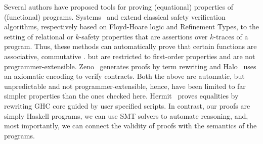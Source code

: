 %
Several authors have proposed tools for proving
(equational) properties of (functional) programs.
%
Systems~\citep{sousa16} and \citep{KobayashiRelational15}
extend classical safety verification algorithms,
respectively based on Floyd-Hoare logic and Refinement Types,
to the setting of relational or $k$-safety properties
that are assertions over $k$-traces of a program.
%
Thus, these methods can automatically prove that
certain functions are associative, commutative \etc.
but are restricted to first-order properties and
are not programmer-extensible.
%
Zeno~\citep{ZENO} generates proofs by term
rewriting and Halo~\citep{halo} uses an axiomatic
encoding to verify contracts.
%
Both the above are automatic, but unpredictable and not
programmer-extensible, hence, have been limited to
far simpler properties than the ones checked here.
%
Hermit~\citep{Farmer15} proves equalities by rewriting
GHC core guided by user specified scripts.
%
In contrast, our proofs are simply Haskell programs,
we can use SMT solvers to automate reasoning, and,
most importantly, we can connect the validity of
proofs with the semantics of the programs.

%
%
